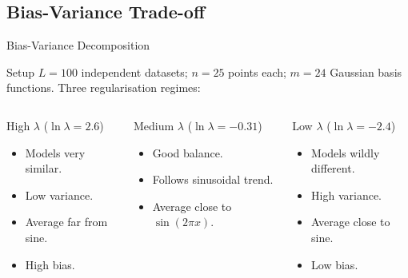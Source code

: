 \subsection{Bias-Variance Trade-off}

\begin{frame}{Bias-Variance Decomposition}
  \begin{block}{Setup}
    $L=100$ independent datasets; $n=25$ points each; $m=24$ Gaussian basis functions.
    Three regularisation regimes:
  \end{block}
  \vspace{.3em}
  \begin{columns}[T]
  \begin{alertblock}{High $\lambda$ ($\ln\lambda=2.6$)}
    \begin{itemize}
      \item Models very similar.
      \item \alert{Low variance.}
      \item Average far from sine.
      \item \alert{High bias.}
    \end{itemize}
  \end{alertblock}
  \begin{exampleblock}{Medium $\lambda$ ($\ln\lambda=-0.31$)}
    \begin{itemize}
      \item Good balance.
      \item Follows sinusoidal trend.
      \item Average close to $\sin(2\pi x)$.
    \end{itemize}
  \end{exampleblock}
  \begin{alertblock}{Low $\lambda$ ($\ln\lambda=-2.4$)}
    \begin{itemize}
      \item Models wildly different.
      \item \alert{High variance.}
      \item Average close to sine.
      \item \alert{Low bias.}
    \end{itemize}
  \end{alertblock}
  \end{columns}
\end{frame}


